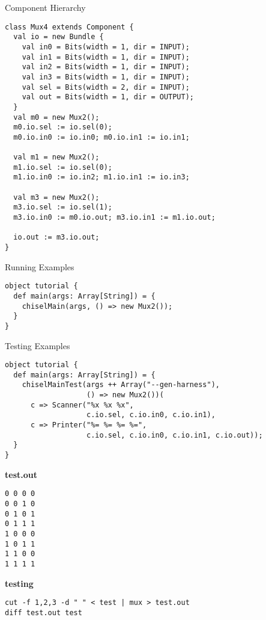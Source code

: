 \documentclass[xcolor=pdflatex,dvipsnames,table]{beamer}
\begin{document}
\begin{frame}{Component Hierarchy}
\begin{lstlisting}
class Mux4 extends Component {
  val io = new Bundle {
    val in0 = Bits(width = 1, dir = INPUT);
    val in1 = Bits(width = 1, dir = INPUT);
    val in2 = Bits(width = 1, dir = INPUT);
    val in3 = Bits(width = 1, dir = INPUT);
    val sel = Bits(width = 2, dir = INPUT);
    val out = Bits(width = 1, dir = OUTPUT);
  }
  val m0 = new Mux2();
  m0.io.sel := io.sel(0); 
  m0.io.in0 := io.in0; m0.io.in1 := io.in1;

  val m1 = new Mux2();
  m1.io.sel := io.sel(0); 
  m1.io.in0 := io.in2; m1.io.in1 := io.in3;

  val m3 = new Mux2();
  m3.io.sel := io.sel(1); 
  m3.io.in0 := m0.io.out; m3.io.in1 := m1.io.out;

  io.out := m3.io.out;
}
\end{lstlisting}
\end{frame}

\begin{frame}[fragile]{Running Examples}
\begin{lstlisting}
object tutorial {
  def main(args: Array[String]) = {
    chiselMain(args, () => new Mux2());
  }
}
\end{lstlisting}
\end{frame}

\begin{frame}{Testing Examples}

\begin{lstlisting}
object tutorial {
  def main(args: Array[String]) = {
    chiselMainTest(args ++ Array("--gen-harness"), 
                   () => new Mux2())(
      c => Scanner("%x %x %x", 
                   c.io.sel, c.io.in0, c.io.in1),
      c => Printer("%= %= %= %=", 
                   c.io.sel, c.io.in0, c.io.in1, c.io.out));
  }
}
\end{lstlisting}

\textbf{test.out}

\begin{lstlisting}
0 0 0 0
0 0 1 0
0 1 0 1
0 1 1 1
1 0 0 0
1 0 1 1
1 1 0 0
1 1 1 1
\end{lstlisting}

\textbf{testing}

\begin{lstlisting}
cut -f 1,2,3 -d " " < test | mux > test.out
diff test.out test
\end{lstlisting}

\end{frame}
\end{document}
